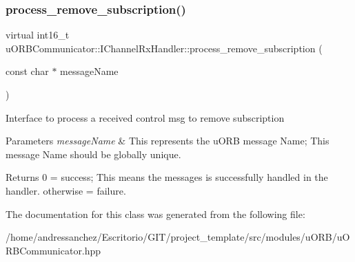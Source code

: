 \subsubsection{\texorpdfstring{process\+\_\+remove\+\_\+subscription()}{process\_remove\_subscription()}}
{\footnotesize\ttfamily virtual int16\+\_\+t u\+O\+R\+B\+Communicator\+::\+I\+Channel\+Rx\+Handler\+::process\+\_\+remove\+\_\+subscription (\begin{DoxyParamCaption}\item[{const char $\ast$}]{message\+Name }\end{DoxyParamCaption})\hspace{0.3cm}{\ttfamily [pure virtual]}}

Interface to process a received control msg to remove subscription 
\begin{DoxyParams}{Parameters}
{\em message\+Name} & This represents the u\+O\+RB message Name; This message Name should be globally unique. \\
\hline
\end{DoxyParams}
\begin{DoxyReturn}{Returns}
0 = success; This means the messages is successfully handled in the handler. otherwise = failure. 
\end{DoxyReturn}


The documentation for this class was generated from the following file\+:\begin{DoxyCompactItemize}
\item 
/home/andressanchez/\+Escritorio/\+G\+I\+T/project\+\_\+template/src/modules/u\+O\+R\+B/u\+O\+R\+B\+Communicator.\+hpp\end{DoxyCompactItemize}
